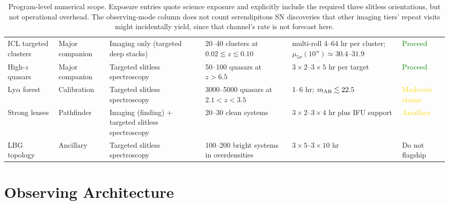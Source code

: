 \documentclass[10pt,onecolumn]{article}
\begin{document}
\begin{table}[tp]
\begin{tabularx}{\textwidth}{@{}p{2.1cm}p{1.6cm}p{2.7cm}p{2.9cm}p{2.9cm}Y@{}}
ICL targeted clusters & Major companion & Imaging only (targeted deep stacks) & 20--40 clusters at $0.02\lesssim z\lesssim0.10$ & multi-roll 4--64 hr per cluster; $\mu_{5\sigma}(10'')\simeq30.4$--$31.9$ & \textcolor{green}{Proceed}\\
High-$z$ quasars & Major companion & Targeted slitless spectroscopy & 50--100 quasars at $z>6.5$ & $3\times2$--$3\times5$ hr per target & \textcolor{green}{Proceed}\\
Ly$\alpha$ forest & Calibration & Targeted slitless spectroscopy & 3000--5000 quasars at $2.1<z<3.5$ & 1--6 hr; $m_{\rm AB}\lesssim22.5$ & \textcolor{gold}{Moderate claims}\\
Strong lenses & Pathfinder & Imaging (finding) $+$ targeted slitless spectroscopy & 20--30 clean systems & $3\times2$--$3\times4$ hr plus IFU support & \textcolor{gold}{Ancillary}\\
LBG topology & Ancillary & Targeted slitless spectroscopy & 100--200 bright systems in overdensities & $3\times5$--$3\times10$ hr & \textcolor{rose}{Do not flagship}\\
\bottomrule
\end{tabularx}
\caption{Program-level numerical scope. Exposure entries quote science exposure and explicitly include the required three slitless orientations, but not operational overhead. The observing-mode column does not count serendipitous SN discoveries that other imaging tiers' repeat visits might incidentally yield, since that channel's rate is not forecast here.}
\label{tab:triage}
\end{table}

\clearpage
\section{Observing Architecture}
\end{document}
